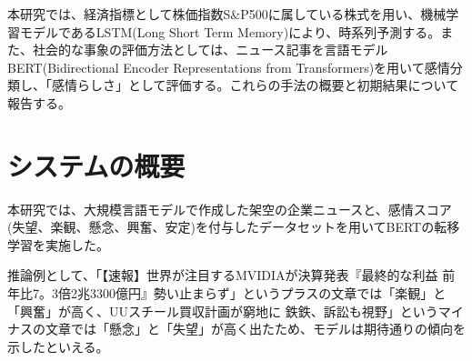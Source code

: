 \documentclass[a4paper, 10pt]{article}
\begin{document}
本研究では、経済指標として株価指数S\&P500に属している株式を用い、機械学習モデルであるLSTM(Long Short Term Memory)により、時系列予測する。また、社会的な事象の評価方法としては、ニュース記事を言語モデルBERT(Bidirectional Encoder Representations from Transformers)を用いて感情分類し、「感情らしさ」として評価する。これらの手法の概要と初期結果について報告する。



\section{システムの概要}





本研究では、大規模言語モデルで作成した架空の企業ニュースと、感情スコア(失望、楽観、懸念、興奮、安定)を付与したデータセットを用いてBERTの転移学習を実施した。

推論例として、「【速報】世界が注目するMVIDIAが決算発表『最終的な利益 前年比7。3倍2兆3300億円』勢い止まらず」というプラスの文章では「楽観」と「興奮」が高く、UUスチール買収計画が窮地に 鉄鉄、訴訟も視野」というマイナスの文章では「懸念」と「失望」が高く出たため、モデルは期待通りの傾向を示したといえる。
\end{document}
